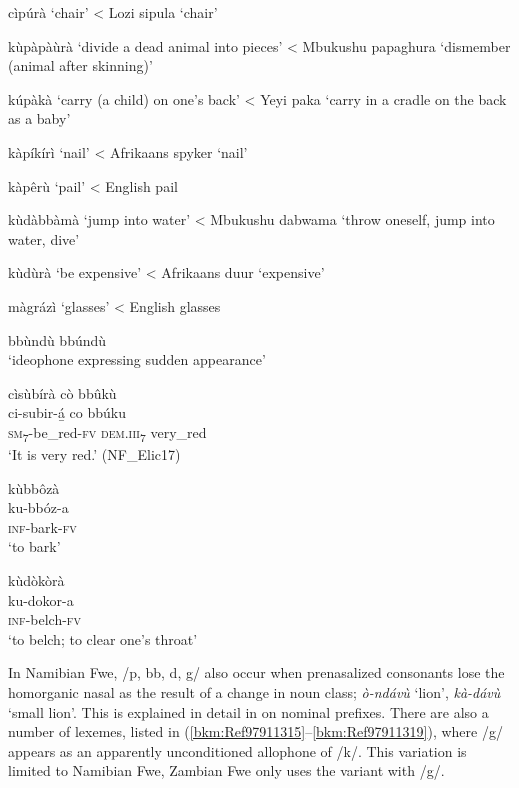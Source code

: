 \ea
\label{bkm:Ref71645400}
  cìpúrà ‘chair’ < Lozi sipula ‘chair’ \citep[27]{Burger1960}
\z

\ea
  kùpàpàùrà ‘divide a dead animal into pieces’ < Mbukushu papaghura ‘dismember (animal after skinning)’ \citep[175]{Wynne1980}
\z

\ea
  kúpàkà ‘carry (a child) on one’s back’ < Yeyi paka ‘carry in a cradle on the back as a baby’ \citep[140-141]{Lukusa2009}
\z

\ea
  kàpíkírì ‘nail’ < Afrikaans spyker ‘nail’
\z

\ea
  kàpêrù ‘pail’ < English pail
\z

\ea
  kùdàbbàmà ‘jump into water’ < Mbukushu dabwama ‘throw oneself, jump into water, dive’ \citep[393]{Wynne1980}
\z

\ea
  kùdùrà ‘be expensive’ < Afrikaans duur ‘expensive’
\z

\ea
\label{bkm:Ref97911219}
 màgrázì ‘glasses’ < English glasses
\z

\ea
\label{bkm:Ref71645446}
 bbùndù bbúndù\\
\glt ‘ideophone expressing sudden appearance’
\z

\ea
cìsùbírà cò bbûkù\\
\gll ci-subir-á̲    co    bbúku\\
\textsc{sm}\textsubscript{7}-be\_red-\textsc{fv}  \textsc{dem}.\textsc{iii}\textsubscript{7}  very\_red\\
\glt ‘It is very red.’ (NF\_Elic17)
\z

\ea
\glll kùbbôzà\\
ku-bbóz-a\\
\textsc{inf}-bark-\textsc{fv}\\
\glt ‘to bark’
\z

\ea
\label{bkm:Ref71645447}
\glll kùdòkòrà\\
ku-dokor-a\\
\textsc{inf}-belch-\textsc{fv}\\
\glt ‘to belch; to clear one’s throat’
\z

In Namibian Fwe, /p, bb, d, g/ also occur when prenasalized consonants lose the homorganic nasal as the result of a change in noun class; \textit{ò-ndávù} ‘lion’, \textit{kà-dávù} ‘small lion’. This is explained in detail in  on nominal prefixes. There are also a number of lexemes, listed in (\ref{bkm:Ref97911315}--\ref{bkm:Ref97911319}), where /g/ appears as an apparently unconditioned allophone of /k/. This variation is limited to Namibian Fwe, Zambian Fwe only uses the variant with /g/.

